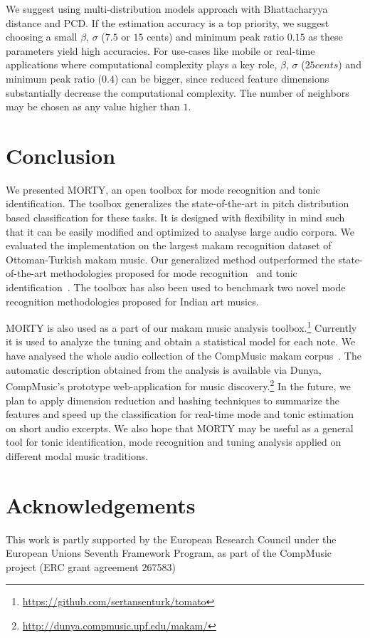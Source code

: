 \documentclass{sig-alternate}
\begin{document}
We suggest using multi-distribution models approach with Bhattacharyya distance and PCD. If the estimation accuracy is a top priority, we suggest choosing a small $\beta$, $\sigma$ ($7.5$ or $15$ cents) and minimum peak ratio $0.15$ as these parameters yield high accuracies. For use-cases like mobile or real-time applications where computational complexity plays a key role, $\beta$, $\sigma$ ($25 cents$) and minimum peak ratio ($0.4$) can be bigger, since reduced feature dimensions substantially decrease the computational complexity. The number of neighbors may be chosen as any value higher than $1$.

\section{Conclusion}\label{sec:conclusion}
We presented MORTY, an open toolbox for mode recognition and tonic identification. The toolbox generalizes the state-of-the-art in pitch distribution based classification for these tasks. It is designed with flexibility in mind such that it can be easily modified and optimized to analyse large audio corpora. We evaluated the implementation on the largest makam recognition dataset of Ottoman-Turkish makam music. Our generalized method outperformed the state-of-the-art methodologies proposed for mode recognition~\cite{bozkurt_makam} and tonic identification~\cite{bozkurt_tonic, atli2014makamFeature_atmm}. The toolbox has also been used to benchmark two novel mode recognition methodologies proposed for Indian art musics. 

MORTY is also used as a part of our makam music analysis toolbox.\footnote{\url{https://github.com/sertansenturk/tomato}} Currently it is used to analyze the tuning and obtain a statistical model for each note. We have analysed the whole audio collection of the CompMusic makam corpus~\cite{compmusic_corpus}. The automatic description obtained from the analysis is available via Dunya, CompMusic's prototype web-application for music discovery.\footnote{\url{http://dunya.compmusic.upf.edu/makam/}} In the future, we plan to apply dimension reduction and hashing techniques to summarize the features and speed up the classification for real-time mode and tonic estimation on short audio excerpts. We also hope that MORTY may be useful as a general tool for tonic identification, mode recognition and tuning analysis applied on different modal music traditions.

\section{Acknowledgements}This work is partly supported by the European Research Council under the European Unions Seventh Framework Program, as part of the CompMusic project (ERC grant agreement 267583)



\end{document}
